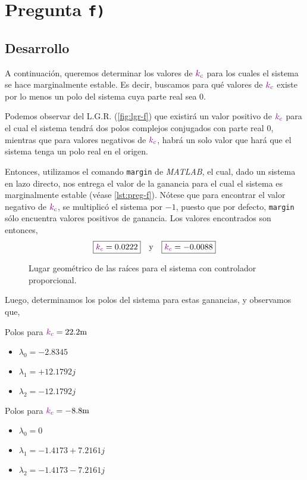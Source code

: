 \section{Pregunta \texttt{f)}}\label{pregunta-f}

\subsection{Desarrollo}

A continuación, queremos determinar los valores de $\mathbin{\color{violet}k_{c}}$ para los cuales
el sistema se hace marginalmente estable. Es decir, buscamos para qué valores de
$\mathbin{\color{violet}k_{c}}$ existe por lo menos un polo del sistema cuya parte real sea $0$.

Podemos observar del L.G.R. (\autoref{fig:lgr-f}) que existirá un valor positivo
de $\mathbin{\color{violet}k_{c}}$ para el cual el sistema tendrá dos polos complejos conjugados
con parte real $0$, mientras que para valores negativos de $\mathbin{\color{violet}k_{c}}$, habrá
un solo valor que hará que el sistema tenga un polo real en el origen.

Entonces, utilizamos el comando \verb|margin| de \textit{MATLAB}, el cual, dado
un sistema en lazo directo, nos entrega el valor de la ganancia para el cual el
sistema es marginalmente estable (véase \autoref{lst:preg-f}). Nótese que para
encontrar el valor negativo de $\mathbin{\color{violet}k_{c}}$, se multiplicó el sistema por $-1$,
puesto que por defecto, \verb|margin| sólo encuentra valores positivos de ganancia.
Los valores encontrados son entonces,
\begin{equation}
    \boxed{\mathbin{\color{violet}k_{c}} = 0.0222} \quad \text{y} \quad \boxed{\mathbin{\color{violet}k_{c}} = -0.0088}
\end{equation}

\begin{figure}[ht]
  \centering
  
  \caption{Lugar geométrico de las raíces para el sistema con controlador proporcional.}
  \label{fig:lgr-f}
\end{figure}

Luego, determinamos los polos del sistema para estas ganancias, y observamos que,
\begin{multicols}{2}
    Polos para $\mora{k_{c}} = 22.2\unit{m}$
    \begin{itemize}
        \item $\lambda_{0} = -2.8345$
        \item $\lambda_{1} = +12.1792j$
        \item $\lambda_{2} = -12.1792j$
    \end{itemize}

    Polos para $\mora{k_{c}} = -8.8\unit{m}$
    \begin{itemize}
        \item $\lambda_{0} = 0$
        \item $\lambda_{1} = -1.4173 + 7.2161j$
        \item $\lambda_{2} = -1.4173 - 7.2161j$
    \end{itemize}
\end{multicols}

